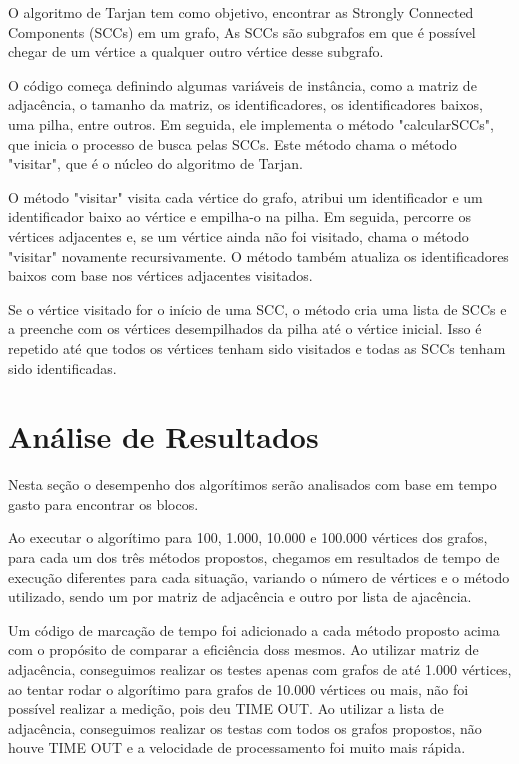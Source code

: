  
 
O algoritmo de Tarjan tem como objetivo, encontrar as Strongly Connected Components (SCCs) em um grafo, As SCCs são subgrafos em que é possível chegar de um vértice a qualquer outro vértice desse subgrafo.

O código começa definindo algumas variáveis de instância, como a matriz de adjacência, o tamanho da matriz, os identificadores, os identificadores baixos, uma pilha, entre outros. Em seguida, ele implementa o método "calcularSCCs", que inicia o processo de busca pelas SCCs. Este método chama o método "visitar", que é o núcleo do algoritmo de Tarjan.

O método "visitar" visita cada vértice do grafo, atribui um identificador e um identificador baixo ao vértice e empilha-o na pilha. Em seguida, percorre os vértices adjacentes e, se um vértice ainda não foi visitado, chama o método "visitar" novamente recursivamente. O método também atualiza os identificadores baixos com base nos vértices adjacentes visitados.

Se o vértice visitado for o início de uma SCC, o método cria uma lista de SCCs e a preenche com os vértices desempilhados da pilha até o vértice inicial. Isso é repetido até que todos os vértices tenham sido visitados e todas as SCCs tenham sido identificadas.

\section{\esp Análise de Resultados}

Nesta seção o desempenho dos algorítimos serão analisados com base em tempo gasto para encontrar os blocos.

Ao executar o algorítimo para 100, 1.000, 10.000 e 100.000 vértices dos grafos, para cada um dos três métodos propostos, chegamos em resultados de tempo de execução diferentes para cada situação, variando o número de vértices e o método utilizado, sendo um por matriz de adjacência e outro por lista de ajacência. 

Um código de marcação de tempo foi adicionado a cada método proposto acima com o propósito de comparar a eficiência doss mesmos.
Ao utilizar matriz de adjacência, conseguimos realizar os testes apenas com grafos de até 1.000 vértices, ao tentar rodar o algorítimo para grafos de 10.000 vértices ou mais, não foi possível realizar a medição, pois deu TIME OUT.
Ao utilizar a lista de adjacência, conseguimos realizar os testas com todos os grafos propostos, não houve TIME OUT e a velocidade de processamento foi muito mais rápida. 

